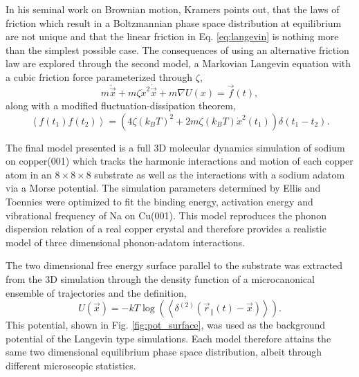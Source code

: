 \documentclass[7pt]{article}
\begin{document}
In his seminal work on Brownian motion, Kramers points out, that the laws of friction which result in a Boltzmannian phase space distribution at equilibrium are not unique and that the linear friction in Eq. \ref{eq:langevin} is nothing more than the simplest possible case\cite{Kramers}. The consequences of using an alternative friction law are explored through the second model, a Markovian Langevin equation with a cubic friction force parameterized through $\zeta$,
$$
m\ddot{\vec{x}} + m\zeta\dot{x}^2\dot{\vec{x}} + m \nabla U(x) = \vec{f}(t),
$$
along with a modified fluctuation-dissipation theorem\cite{Kramers},
$$\left<f(t_1)f(t_2)\right>=\left(4\zeta\left(k_BT\right)^2 + 2 m \zeta \left(k_BT\right)\dot{x}^2(t_1)\right)\delta\left(t_1-t_2\right).$$

The final model presented is a full 3D molecular dynamics simulation of sodium on copper(001) which tracks the harmonic interactions and motion of each copper atom in an $8\times8\times8$ substrate as well as the interactions with a sodium adatom via a Morse potential. The simulation parameters determined by Ellis and Toennies\cite{Ellis} were optimized to fit the binding energy, activation energy and vibrational frequency of Na on Cu(001). This model reproduces the phonon dispersion relation of a real copper crystal\cite{Sinha} and therefore provides a realistic model of three dimensional phonon-adatom interactions.

The two dimensional free energy surface parallel to the substrate was extracted from the 3D simulation through the density function of a microcanonical ensemble of trajectories and the definition,
$$U(\vec{x}) = -kT\log\left(\left<\delta^{(2)}(\vec{r}_{\parallel}(t) - \vec{x})\right>\right).$$
This potential, shown in Fig. \ref{fig:pot_surface}, was used as the background potential of the Langevin type simulations. Each model therefore attains the same two dimensional equilibrium phase space distribution, albeit through different microscopic statistics. 
\end{document}
